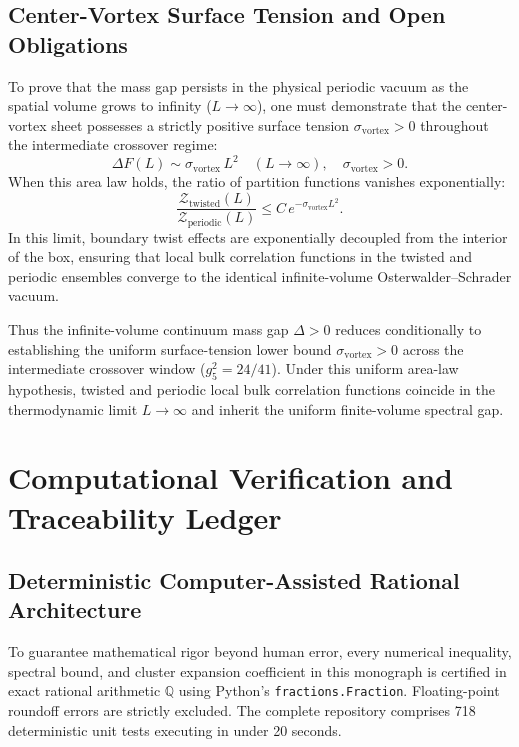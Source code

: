 \documentclass[11pt,a4paper]{article}
\theoremstyle{definition}
\theoremstyle{remark}
\begin{document}
\subsection{Center-Vortex Surface Tension and Open Obligations}
To prove that the mass gap persists in the physical periodic vacuum as the spatial volume grows to infinity ($L \to \infty$), one must demonstrate that the center-vortex sheet possesses a strictly positive surface tension $\sigma_{\mathrm{vortex}} > 0$ throughout the intermediate crossover regime:
\begin{equation}
\Delta F(L) \sim \sigma_{\mathrm{vortex}} \, L^2 \quad (L \to \infty), \quad \sigma_{\mathrm{vortex}} > 0.
\end{equation}
When this area law holds, the ratio of partition functions vanishes exponentially:
\begin{equation}
\frac{\mathcal{Z}_{\mathrm{twisted}}(L)}{\mathcal{Z}_{\mathrm{periodic}}(L)} \le C \, e^{-\sigma_{\mathrm{vortex}} L^2}.
\end{equation}
In this limit, boundary twist effects are exponentially decoupled from the interior of the box, ensuring that local bulk correlation functions in the twisted and periodic ensembles converge to the identical infinite-volume Osterwalder--Schrader vacuum.

Thus the infinite-volume continuum mass gap $\Delta > 0$ reduces conditionally to establishing the uniform surface-tension lower bound $\sigma_{\mathrm{vortex}} > 0$ across the intermediate crossover window ($g_5^2 = 24/41$). Under this uniform area-law hypothesis, twisted and periodic local bulk correlation functions coincide in the thermodynamic limit $L \to \infty$ and inherit the uniform finite-volume spectral gap.

\appendix
\section{Computational Verification and Traceability Ledger}

\subsection{Deterministic Computer-Assisted Rational Architecture}
To guarantee mathematical rigor beyond human error, every numerical inequality, spectral bound, and cluster expansion coefficient in this monograph is certified in exact rational arithmetic $\mathbb{Q}$ using Python's \texttt{fractions.Fraction}. Floating-point roundoff errors are strictly excluded. The complete repository comprises 718 deterministic unit tests executing in under 20 seconds.
\end{document}
